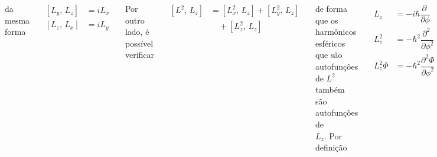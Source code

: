 \documentclass[12pt,brazil,table]{beamer}
\begin{document}
\begin{frame}
\begin{columns}[T]
      da mesma forma
      
      \begin{align*}
            \left[ L_y,\, L_z\right] &= iL_x\\
            \left[ L_z,\, L_x\right] &= iL_y
          \end{align*}
          
      Por outro lado, é possível verificar
      
      \begin{align*}
            \left[ L^2 ,\, L_z \right] &= \left[ L_x^2 ,\, L_z \right] + \left[ L_y^2 ,\, L_z \right]\\
            &\quad + \left[ L_z^2 ,\, L_z \right]
          \end{align*}
          
      de forma que os harmônicos esféricos que são autofunções de 
      $L^2$ também são autofunções de \\
      $L_z$. Por definição
      
      \begin{align*}
            L_z &= -i\hbar \dfrac{\partial \;}{\partial \phi}\\
            L_z^2 &= -\hbar^2 \dfrac{\partial^2 \;}{\partial \phi^2}\\
            L_z^2\Phi &= -\hbar^2 \dfrac{\partial^2 \Phi}{\partial \phi^2}
          \end{align*}
  \end{columns}

\end{frame}

% 
% 
% 
%   
%   
%   
%   
% 
%   
%   
% 
% 
\end{document}
